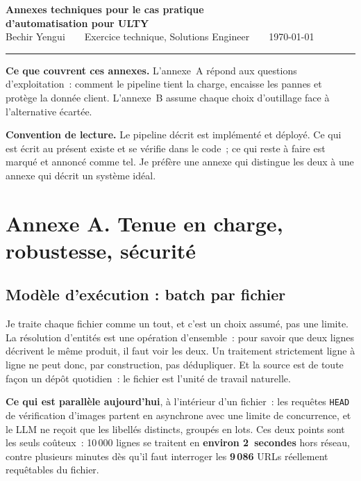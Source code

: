 \documentclass[11pt,a4paper]{article}
\newcommand{\pa}{\textcolor{amber}{\small\ding{108}}}
\newcommand{\code}[1]{\texttt{\small #1}}
\newcommand{\candidat}{Bechir Yengui}
\begin{document}
\begin{center}
{\LARGE\bfseries\color{accent}Annexes techniques pour le cas pratique\\[2pt] d'automatisation pour ULTY}\\[6pt]
{\color{soft}\small \candidat\ \ \textbullet\ \ Exercice technique, Solutions Engineer\ \ \textbullet\ \ \today}\\[3pt]
{\color{rulec}\rule{\linewidth}{0.8pt}}
\end{center}

\begin{verdictbox}
\textbf{Ce que couvrent ces annexes.} L'annexe~A répond aux questions d'exploitation~: comment le
pipeline tient la charge, encaisse les pannes et protège la donnée client. L'annexe~B assume chaque
choix d'outillage face à l'alternative écartée.

\textbf{Convention de lecture.} Le pipeline décrit est implémenté et déployé. Ce qui est écrit au
présent existe et se vérifie dans le code~; ce qui reste à faire est marqué \pa{} et annoncé comme
tel. Je préfère une annexe qui distingue les deux à une annexe qui décrit un système idéal.
\end{verdictbox}

\section*{Annexe A. Tenue en charge, robustesse, sécurité}

\subsection{Modèle d'exécution : batch par fichier}
Je traite chaque fichier comme un tout, et c'est un choix assumé, pas une limite. La résolution
d'entités est une opération d'ensemble~: pour savoir que deux lignes décrivent le même produit, il
faut voir les deux. Un traitement strictement ligne à ligne ne peut donc, par construction, pas
dédupliquer. Et la source est de toute façon un dépôt quotidien~: le fichier est l'unité de travail
naturelle.

\textbf{Ce qui est parallèle aujourd'hui}, à l'intérieur d'un fichier~: les requêtes \code{HEAD} de
vérification d'images partent en asynchrone avec une limite de concurrence, et le LLM ne reçoit que
les libellés distincts, groupés en lots. Ces deux points sont les seuls coûteux~: 10\,000 lignes se
traitent en \textbf{environ 2~secondes} hors réseau, contre plusieurs minutes dès qu'il faut
interroger les \textbf{9\,086} URLs réellement requêtables du fichier.
\end{document}
